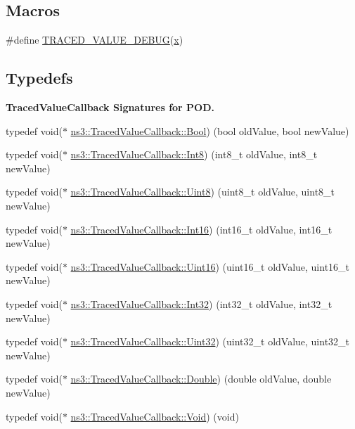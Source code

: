 \subsection*{Macros}
\begin{DoxyCompactItemize}
\item 
\#define \hyperlink{traced-value_8h_a0fdb05fddad372b163c4cf91111b4eec}{T\+R\+A\+C\+E\+D\+\_\+\+V\+A\+L\+U\+E\+\_\+\+D\+E\+B\+UG}(\hyperlink{lte__link__budget__x2__handover__measures_8m_a9336ebf25087d91c818ee6e9ec29f8c1}{x})
\end{DoxyCompactItemize}
\subsection*{Typedefs}
\begin{Indent}{\bf Traced\+Value\+Callback Signatures for P\+OD.}\par
\begin{DoxyCompactItemize}
\item 
typedef void($\ast$ \hyperlink{namespacens3_1_1TracedValueCallback_a3761efe7d95bb03411e1f3a97801b83a}{ns3\+::\+Traced\+Value\+Callback\+::\+Bool}) (bool old\+Value, bool new\+Value)
\item 
typedef void($\ast$ \hyperlink{namespacens3_1_1TracedValueCallback_a2fb8cf64394b8b31d0371efc3ca9fd32}{ns3\+::\+Traced\+Value\+Callback\+::\+Int8}) (int8\+\_\+t old\+Value, int8\+\_\+t new\+Value)
\item 
typedef void($\ast$ \hyperlink{namespacens3_1_1TracedValueCallback_afe3b1b129457374bd27c782da6d3583f}{ns3\+::\+Traced\+Value\+Callback\+::\+Uint8}) (uint8\+\_\+t old\+Value, uint8\+\_\+t new\+Value)
\item 
typedef void($\ast$ \hyperlink{namespacens3_1_1TracedValueCallback_ac7c118b3f2535cf3b6a24b0378e164ec}{ns3\+::\+Traced\+Value\+Callback\+::\+Int16}) (int16\+\_\+t old\+Value, int16\+\_\+t new\+Value)
\item 
typedef void($\ast$ \hyperlink{namespacens3_1_1TracedValueCallback_a0966dfa38c6729766c3e68f8a3996b41}{ns3\+::\+Traced\+Value\+Callback\+::\+Uint16}) (uint16\+\_\+t old\+Value, uint16\+\_\+t new\+Value)
\item 
typedef void($\ast$ \hyperlink{namespacens3_1_1TracedValueCallback_a1845ec78343b2fd1bdc81085681f20eb}{ns3\+::\+Traced\+Value\+Callback\+::\+Int32}) (int32\+\_\+t old\+Value, int32\+\_\+t new\+Value)
\item 
typedef void($\ast$ \hyperlink{namespacens3_1_1TracedValueCallback_a7a8acb7551dcca7b77b7488bbe00b042}{ns3\+::\+Traced\+Value\+Callback\+::\+Uint32}) (uint32\+\_\+t old\+Value, uint32\+\_\+t new\+Value)
\item 
typedef void($\ast$ \hyperlink{namespacens3_1_1TracedValueCallback_a20db2298d43cb2d3b673f706fbc20037}{ns3\+::\+Traced\+Value\+Callback\+::\+Double}) (double old\+Value, double new\+Value)
\item 
typedef void($\ast$ \hyperlink{namespacens3_1_1TracedValueCallback_aa63613617d4ddb8f016ed0edb0300270}{ns3\+::\+Traced\+Value\+Callback\+::\+Void}) (void)
\end{DoxyCompactItemize}
\end{Indent}
